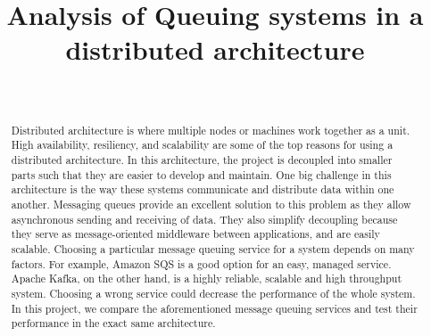 \documentclass{IEEEtran}
\begin{document}
%
\title{Analysis of Queuing systems in a distributed architecture}


\author{ \\
 }
 
\maketitle

\begin{abstract}
Distributed architecture is where multiple nodes or machines work together as a unit. High availability, resiliency, and scalability are some of the top reasons for using a distributed architecture. In this architecture, the project is decoupled into smaller parts such that they are easier to develop and maintain. One big challenge in this architecture is the way these systems communicate and distribute data within one another. Messaging queues provide an excellent solution to this problem as they allow asynchronous sending and receiving of data. They also simplify decoupling because they serve as message-oriented middleware between applications, and are easily scalable. Choosing a particular message queuing service for a system depends on many factors. For example, Amazon SQS is a good option for an easy, managed service. Apache Kafka, on the other hand, is a highly reliable, scalable and high throughput system. Choosing a wrong service could decrease the performance of the whole system. In this project, we compare the aforementioned message queuing services and test their performance in the exact same architecture. 


\end{abstract}
\end{document}
